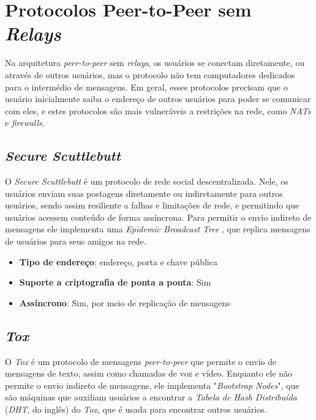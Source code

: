 \section{Protocolos Peer-to-Peer sem \textit{Relays}}

Na arquitetura \textit{peer-to-peer} sem \textit{relays}, os usuários se conectam diretamente, ou através de outros usuários, mas o protocolo não tem computadores dedicados para o intermédio de mensagens. Em geral, esses protocolos precisam que o usuário inicialmente saiba o endereço de outros usuários para poder se comunicar com eles, e estes protocolos são mais vulneráveis a restrições na rede, como \textit{NATs} e \textit{firewalls}.

\subsection{\textit{Secure Scuttlebutt}}

O \textit{Secure Scuttlebutt} é um protocolo de rede social descentralizada. Nele, os usuários enviam suas postagens diretamente ou indiretamente para outros usuários, sendo assim resiliente a falhas e limitações de rede, e permitindo que usuários acessem conteúdo de forma assíncrona. Para permitir o envio indireto de mensagens ele implementa uma \textit{Epidemic Broadcast Tree} \cite{ebtpaper}, que replica mensagens de usuários para seus amigos na rede. \cite{scuttlebutt}

\begin{itemize}
  \item \textbf{Tipo de endereço}: endereço, porta e chave pública
  \item \textbf{Suporte a criptografia de ponta a ponta}: Sim
  \item \textbf{Assíncrono}: Sim, por meio de replicação de mensagens
\end{itemize}

\subsection{\textit{Tox}}

O \textit{Tox} é um protocolo de mensagens \textit{peer-to-peer} que permite o envio de mensagens de texto, assim como chamadas de voz e vídeo. Enquanto ele não permite o envio indireto de mensagens, ele implementa "\textit{Bootstrap Nodes}", que são máquinas que auxiliam usuários a encontrar a \textit{Tabela de Hash Distribuída} (\textit{DHT}, do inglês) do \textit{Tox}, que é usada para encontrar outros usuários. \cite{toxcore}


